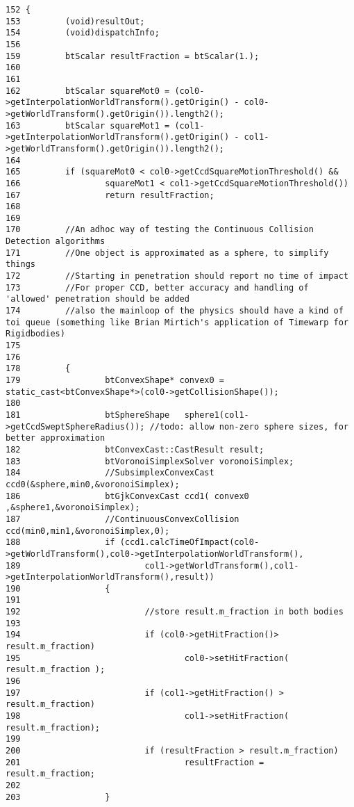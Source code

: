 \begin{Code}\begin{verbatim}152 {
153         (void)resultOut;
154         (void)dispatchInfo;
156 
159         btScalar resultFraction = btScalar(1.);
160 
161 
162         btScalar squareMot0 = (col0->getInterpolationWorldTransform().getOrigin() - col0->getWorldTransform().getOrigin()).length2();
163         btScalar squareMot1 = (col1->getInterpolationWorldTransform().getOrigin() - col1->getWorldTransform().getOrigin()).length2();
164 
165         if (squareMot0 < col0->getCcdSquareMotionThreshold() &&
166                 squareMot1 < col1->getCcdSquareMotionThreshold())
167                 return resultFraction;
168 
169 
170         //An adhoc way of testing the Continuous Collision Detection algorithms
171         //One object is approximated as a sphere, to simplify things
172         //Starting in penetration should report no time of impact
173         //For proper CCD, better accuracy and handling of 'allowed' penetration should be added
174         //also the mainloop of the physics should have a kind of toi queue (something like Brian Mirtich's application of Timewarp for Rigidbodies)
175 
176 
178         {
179                 btConvexShape* convex0 = static_cast<btConvexShape*>(col0->getCollisionShape());
180 
181                 btSphereShape   sphere1(col1->getCcdSweptSphereRadius()); //todo: allow non-zero sphere sizes, for better approximation
182                 btConvexCast::CastResult result;
183                 btVoronoiSimplexSolver voronoiSimplex;
184                 //SubsimplexConvexCast ccd0(&sphere,min0,&voronoiSimplex);
186                 btGjkConvexCast ccd1( convex0 ,&sphere1,&voronoiSimplex);
187                 //ContinuousConvexCollision ccd(min0,min1,&voronoiSimplex,0);
188                 if (ccd1.calcTimeOfImpact(col0->getWorldTransform(),col0->getInterpolationWorldTransform(),
189                         col1->getWorldTransform(),col1->getInterpolationWorldTransform(),result))
190                 {
191 
192                         //store result.m_fraction in both bodies
193 
194                         if (col0->getHitFraction()> result.m_fraction)
195                                 col0->setHitFraction( result.m_fraction );
196 
197                         if (col1->getHitFraction() > result.m_fraction)
198                                 col1->setHitFraction( result.m_fraction);
199 
200                         if (resultFraction > result.m_fraction)
201                                 resultFraction = result.m_fraction;
202 
203                 }

\end{verbatim}
\end{Code}
